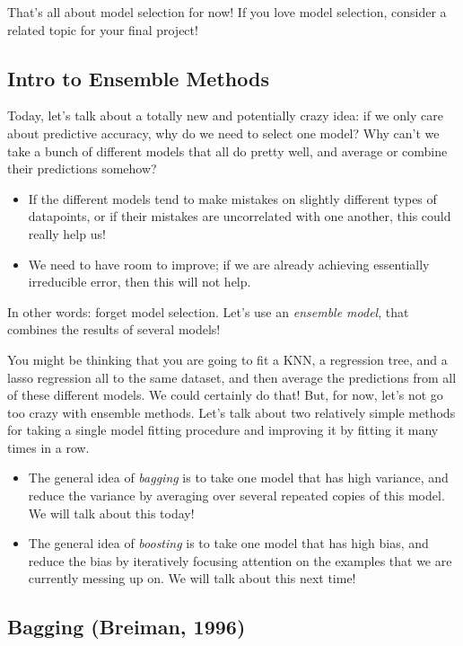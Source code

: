 That's all about model selection for now! If you love model selection, consider a related topic for your final project! 

\subsection{Intro to Ensemble Methods}

Today, let's talk about a totally new and potentially crazy idea: if we only care about predictive accuracy, why do we need to select one model? Why can't we take a bunch of different models that all do pretty well, and average or combine their predictions somehow? 
\begin{itemize}
\item If the different models tend to make mistakes on slightly different types of datapoints, or if their mistakes are uncorrelated with one another, this could really help us! 
\item We need to have room to improve; if we are already achieving essentially irreducible error, then this will not help.	
\end{itemize}
In other words: forget model selection. Let's use an \emph{ensemble model}, that combines the results of several models!

You might be thinking that you are going to fit a KNN, a regression tree, and a lasso regression all to the same dataset, and then average the predictions from all of these different models. We could certainly do that! But, for now, let's not go too crazy with ensemble methods. Let's talk about two relatively simple methods for taking a single model fitting procedure and improving it by fitting it many times in a row. 

\begin{itemize}
\item The general idea of \emph{bagging} is to take one model that has high variance, and reduce the variance by averaging over several repeated copies of this model. We will talk about this today!
\item The general idea of \emph{boosting} is to take one model that has high bias, and reduce the bias by iteratively focusing attention on the examples that we are currently messing up on. We will talk about this next time!
\end{itemize}

\subsection{Bagging (Breiman, 1996)}

